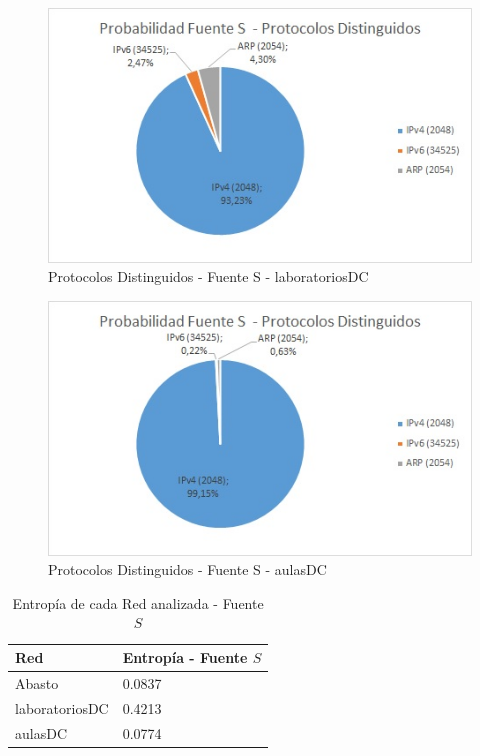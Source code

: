 \begin{figure}[h!]
\centering
\includegraphics[scale=0.7]{./img/probaS_laboDC.jpg}
\caption{Protocolos Distinguidos - Fuente S - laboratoriosDC}
\end{figure}
\newpage

\begin{figure}[h!]
\centering
\includegraphics[scale=0.7]{./img/probaS_aulasDC.jpg}
\caption{Protocolos Distinguidos - Fuente S - aulasDC}
\end{figure}

\begin{table}[htb]
\begin{center}
\begin{tabular}{|l|l|}
\hline
Red & Entropía - Fuente $S$  \\
\hline \hline
Abasto & 0.0837 \\ \hline
laboratoriosDC & 0.4213 \\ \hline
aulasDC & 0.0774  \\ \hline
\end{tabular}
\caption{Entropía de cada Red analizada - Fuente $S$}
\label{tabla informacion}
\end{center}
\end{table}

